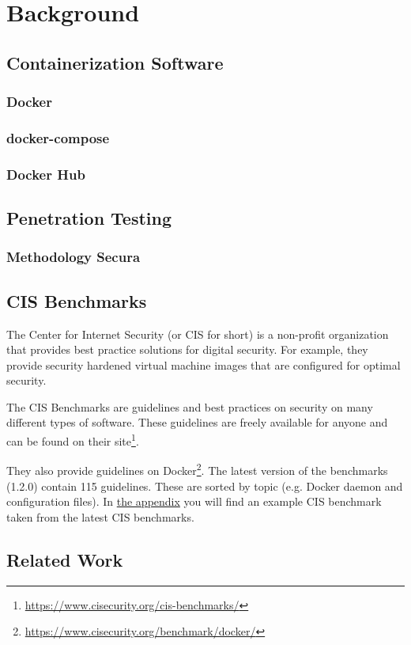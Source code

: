 \chapter{Background}

\section{Containerization Software}
\subsection{Docker}
\subsection{docker-compose}
\subsection{Docker Hub}

\section{Penetration Testing}
\subsection{Methodology Secura}

\section{CIS Benchmarks}
The Center for Internet Security (or CIS for short) is a non-profit organization that provides best practice solutions for digital security. For example, they provide security hardened virtual machine images that are configured for optimal security.

\hfill

The CIS Benchmarks are guidelines and best practices on security on many different types of software. These guidelines are freely available for anyone and can be found on their site\footnote{\url{https://www.cisecurity.org/cis-benchmarks/}}.

\hfill

They also provide guidelines on Docker\footnote{\url{https://www.cisecurity.org/benchmark/docker/}}. The latest version of the benchmarks (1.2.0) contain 115 guidelines. These are sorted by topic (e.g. Docker daemon and configuration files). In \hyperref[appendix:a]{the appendix} you will find an example CIS benchmark taken from the latest CIS benchmarks.

\section{Related Work}
